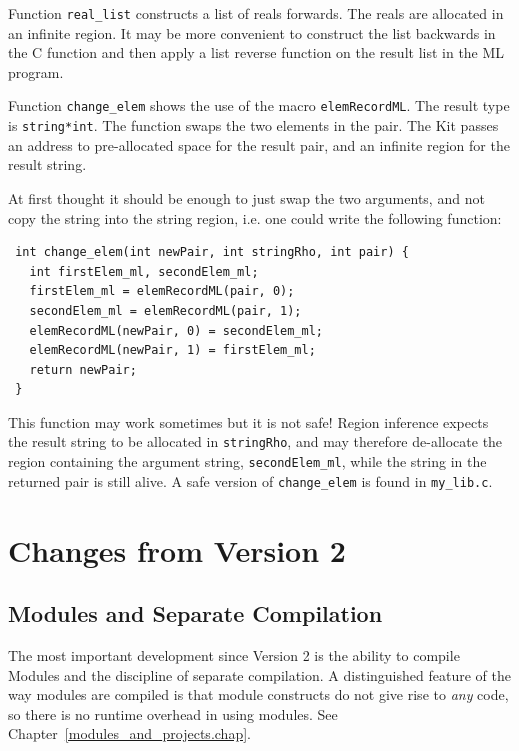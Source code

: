 \documentclass[12pt]{book}
\begin{document}
\begin{example}\label{real_list.ex}
  Function \texttt{real\_list} constructs a list
  of reals forwards. The reals are allocated in an infinite region. It
  may be more convenient to construct the list backwards in the C
  function and then apply a list reverse function on the result list
  in the ML program.
\end{example}

\begin{example}\label{change_elem.ex}
  Function \texttt{change\_elem} shows the use of
  the macro \texttt{elemRecordML}. The result type is \texttt{string*int}. The
  function swaps the two elements in the pair. The Kit passes an address to
  pre-allocated space for the result pair, and an infinite region for the
  result string.
  
  At first thought it should be enough to just swap the two arguments, and
  not copy the string into the string region, i.e. one could write the
  following function:
\begin{verbatim}
 int change_elem(int newPair, int stringRho, int pair) {
   int firstElem_ml, secondElem_ml;
   firstElem_ml = elemRecordML(pair, 0);
   secondElem_ml = elemRecordML(pair, 1);
   elemRecordML(newPair, 0) = secondElem_ml;
   elemRecordML(newPair, 1) = firstElem_ml;
   return newPair;
 }
\end{verbatim}
  This function may work sometimes but it is not safe! Region
  inference expects the result string to be allocated in
  \texttt{stringRho}, and may therefore de-allocate the region containing
  the argument string, \verb|secondElem_ml|, while the string in the
  returned pair is still alive. A safe version of \verb|change_elem| is
  found in \verb|my_lib.c|.
\end{example}

\chapter{Changes from Version 2}
\section{Modules and Separate Compilation}
The most important development since Version 2 is the
ability to compile Modules and the discipline of separate 
compilation. A distinguished feature of the way modules are
compiled is that module constructs do not give rise to 
{\em any} code, so there is no runtime overhead in using modules. See
Chapter~\ref{modules_and_projects.chap}.
\end{document}

